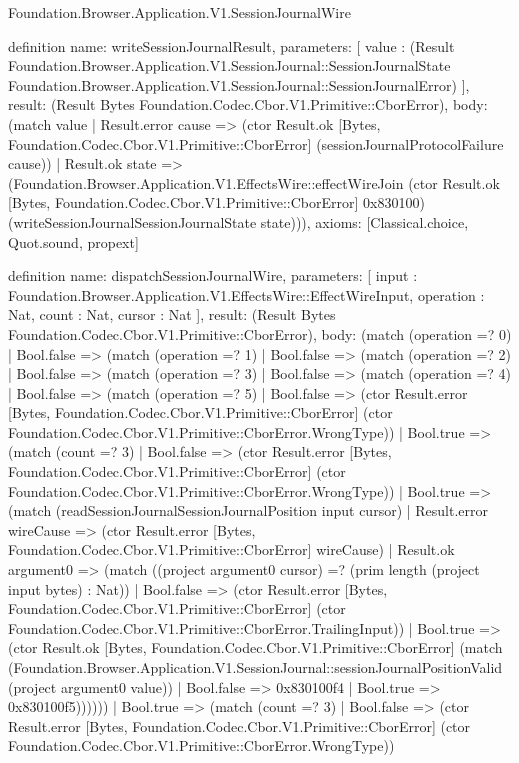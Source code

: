 \begin{lexlean}{Foundation.Browser.Application.V1.SessionJournalWire}
\begin{semanticmodule}
definition{
  name: writeSessionJournalResult,
  parameters: [
    value : (Result Foundation.Browser.Application.V1.SessionJournal::SessionJournalState Foundation.Browser.Application.V1.SessionJournal::SessionJournalError)
  ],
  result: (Result Bytes Foundation.Codec.Cbor.V1.Primitive::CborError),
  body: (match value
    | Result.error cause => (ctor Result.ok [Bytes, Foundation.Codec.Cbor.V1.Primitive::CborError] (sessionJournalProtocolFailure cause))
    | Result.ok state => (Foundation.Browser.Application.V1.EffectsWire::effectWireJoin (ctor Result.ok [Bytes, Foundation.Codec.Cbor.V1.Primitive::CborError] 0x830100) (writeSessionJournalSessionJournalState state))),
  axioms: [Classical.choice, Quot.sound, propext]
}

definition{
  name: dispatchSessionJournalWire,
  parameters: [
    input : Foundation.Browser.Application.V1.EffectsWire::EffectWireInput,
    operation : Nat,
    count : Nat,
    cursor : Nat
  ],
  result: (Result Bytes Foundation.Codec.Cbor.V1.Primitive::CborError),
  body: (match (operation =? 0)
    | Bool.false => (match (operation =? 1)
      | Bool.false => (match (operation =? 2)
        | Bool.false => (match (operation =? 3)
          | Bool.false => (match (operation =? 4)
            | Bool.false => (match (operation =? 5)
              | Bool.false => (ctor Result.error [Bytes, Foundation.Codec.Cbor.V1.Primitive::CborError] (ctor Foundation.Codec.Cbor.V1.Primitive::CborError.WrongType))
              | Bool.true => (match (count =? 3)
                | Bool.false => (ctor Result.error [Bytes, Foundation.Codec.Cbor.V1.Primitive::CborError] (ctor Foundation.Codec.Cbor.V1.Primitive::CborError.WrongType))
                | Bool.true => (match (readSessionJournalSessionJournalPosition input cursor)
                  | Result.error wireCause => (ctor Result.error [Bytes, Foundation.Codec.Cbor.V1.Primitive::CborError] wireCause)
                  | Result.ok argument0 => (match ((project argument0 cursor) =? (prim length (project input bytes) : Nat))
                    | Bool.false => (ctor Result.error [Bytes, Foundation.Codec.Cbor.V1.Primitive::CborError] (ctor Foundation.Codec.Cbor.V1.Primitive::CborError.TrailingInput))
                    | Bool.true => (ctor Result.ok [Bytes, Foundation.Codec.Cbor.V1.Primitive::CborError] (match (Foundation.Browser.Application.V1.SessionJournal::sessionJournalPositionValid (project argument0 value))
                      | Bool.false => 0x830100f4
                      | Bool.true => 0x830100f5))))))
            | Bool.true => (match (count =? 3)
              | Bool.false => (ctor Result.error [Bytes, Foundation.Codec.Cbor.V1.Primitive::CborError] (ctor Foundation.Codec.Cbor.V1.Primitive::CborError.WrongType))
}
\end{semanticmodule}
\end{lexlean}
